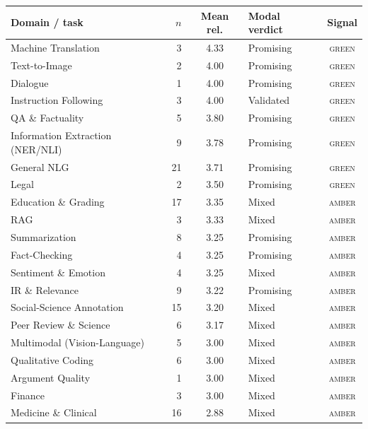 \begin{tabular}{@{}l r c l c@{}}
\toprule
Domain / task & $n$ & Mean rel. & Modal verdict & Signal \\
\midrule
Machine Translation & 3 & 4.33 & Promising & \cellcolor{g!55}\textsc{green} \\
Text-to-Image & 2 & 4.00 & Promising & \cellcolor{g!55}\textsc{green} \\
Dialogue & 1 & 4.00 & Promising & \cellcolor{g!55}\textsc{green} \\
Instruction Following & 3 & 4.00 & Validated & \cellcolor{g!55}\textsc{green} \\
QA \& Factuality & 5 & 3.80 & Promising & \cellcolor{g!55}\textsc{green} \\
Information Extraction (NER/NLI) & 9 & 3.78 & Promising & \cellcolor{g!55}\textsc{green} \\
General NLG & 21 & 3.71 & Promising & \cellcolor{g!55}\textsc{green} \\
Legal & 2 & 3.50 & Promising & \cellcolor{g!55}\textsc{green} \\
Education \& Grading & 17 & 3.35 & Mixed & \cellcolor{a!60}\textsc{amber} \\
RAG & 3 & 3.33 & Mixed & \cellcolor{a!60}\textsc{amber} \\
Summarization & 8 & 3.25 & Promising & \cellcolor{a!60}\textsc{amber} \\
Fact-Checking & 4 & 3.25 & Promising & \cellcolor{a!60}\textsc{amber} \\
Sentiment \& Emotion & 4 & 3.25 & Mixed & \cellcolor{a!60}\textsc{amber} \\
IR \& Relevance & 9 & 3.22 & Promising & \cellcolor{a!60}\textsc{amber} \\
Social-Science Annotation & 15 & 3.20 & Mixed & \cellcolor{a!60}\textsc{amber} \\
Peer Review \& Science & 6 & 3.17 & Mixed & \cellcolor{a!60}\textsc{amber} \\
Multimodal (Vision-Language) & 5 & 3.00 & Mixed & \cellcolor{a!60}\textsc{amber} \\
Qualitative Coding & 6 & 3.00 & Mixed & \cellcolor{a!60}\textsc{amber} \\
Argument Quality & 1 & 3.00 & Mixed & \cellcolor{a!60}\textsc{amber} \\
Finance & 3 & 3.00 & Mixed & \cellcolor{a!60}\textsc{amber} \\
Medicine \& Clinical & 16 & 2.88 & Mixed & \cellcolor{a!60}\textsc{amber} \\

\end{tabular}
